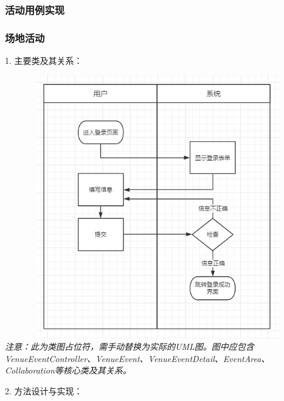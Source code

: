 \documentclass[]{article}
\begin{document}
\hypertarget{ux6d3bux52a8ux7528ux4f8bux5b9eux73b0}{%
\subsubsection{活动用例实现}\label{ux6d3bux52a8ux7528ux4f8bux5b9eux73b0}}

\subsubsection{场地活动}

1. 主要类及其关系：

\includegraphics[width=6.2in,height=4.5in]{media/media/image1.png} %
\textit{注意：此为类图占位符，需手动替换为实际的UML图。图中应包含VenueEventController、VenueEvent、VenueEventDetail、EventArea、Collaboration等核心类及其关系。}

2. 方法设计与实现：
\end{document}
